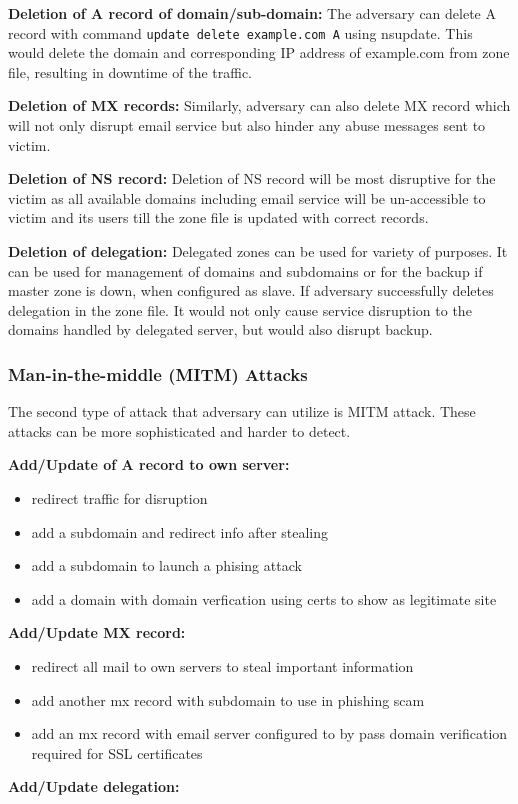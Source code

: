 \textbf{Deletion of A record of domain/sub-domain:} The adversary can delete A record with command \texttt{update delete example.com A} using nsupdate. This would delete the domain and corresponding IP address of example.com from zone file, resulting in downtime of the traffic. 

\textbf{Deletion of MX records:} Similarly, adversary can also delete MX record which will not only disrupt email service but also hinder any abuse messages sent to victim.  

\textbf{Deletion of NS record:} Deletion of NS record will be most disruptive for the victim as all available domains including email service will be un-accessible to victim and its users till the zone file is updated with correct records. 

 \textbf{Deletion of delegation:} Delegated zones can be used for variety of purposes. It can be used for management of domains and subdomains or for the backup if master zone is down,  when configured as slave. If adversary successfully deletes delegation in the zone file. It would not only cause service disruption to the  domains handled by delegated server, but would also disrupt backup. 


\subsubsection{Man-in-the-middle (MITM) Attacks}
The second type of attack that adversary can utilize is MITM attack. These attacks can be more sophisticated and harder to detect. 

\textbf{Add/Update of A record to own server:}
\begin{itemize}
\item redirect traffic for disruption
\item add a subdomain and redirect info after stealing 
\item add a subdomain to launch a phising attack 
\item add a domain with domain verfication using certs to show as legitimate site 
\end{itemize}
\textbf{Add/Update MX record:} 
\begin{itemize}
\item redirect all mail to own servers to steal important information 
\item add another mx record with subdomain to use in phishing scam 
\item add an mx record with email server configured to by pass domain verification required for SSL certificates

\end{itemize}

\textbf{Add/Update delegation:}


